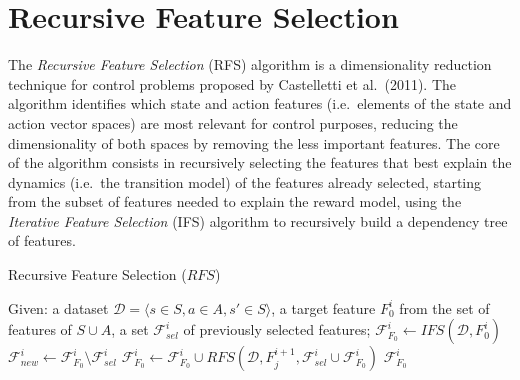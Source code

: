 \section{Recursive Feature Selection}
The \textit{Recursive Feature Selection} (RFS) \cite{castelletti2011tree} 
algorithm is a dimensionality reduction technique for control problems proposed
by Castelletti et al.\ (2011). 
The algorithm identifies which state and action features (i.e.\ elements of the 
state and action vector spaces) are most relevant for control purposes, reducing
the dimensionality of both spaces by removing the less important features.
The core of the algorithm consists in recursively selecting the features that 
best explain the dynamics (i.e.\ the transition model) of the features already 
selected, starting from the subset of features needed to explain the reward 
model, using the \textit{Iterative Feature Selection} (IFS) 
\cite{castelletti2013iter} algorithm to recursively build a dependency 
tree of features.
%
\begin{algorithm}
    \caption{Recursive Feature Selection ($RFS$)}
    \label{alg:RFS}
    \begin{algorithmic}
	\STATE Given: a dataset $\mathcal{D} = {\langle s \in S, a \in A, s' \in S \rangle}$, a target feature $F_0^i$ from the set of features of $S \cup A$, a set $\mathcal{F}_{sel}^i$ of previously selected features;
	\STATE $\mathcal{F}_{F_0}^i \leftarrow IFS(\mathcal{D}, F_0^i)$
	\STATE $\mathcal{F}_{new}^i \leftarrow \mathcal{F}_{F_0}^i \setminus \mathcal{F}_{sel}^i$
	    \STATE $\mathcal{F}_{F_0}^i \leftarrow \mathcal{F}_{F_0}^i \cup RFS(\mathcal{D}, F_j^{i+1}, \mathcal{F}_{sel}^i \cup \mathcal{F}_{F_0}^i)$
	\ENDFOR
	\RETURN $\mathcal{F}_{F_0}^i$
    \end{algorithmic}
\end{algorithm}
%

